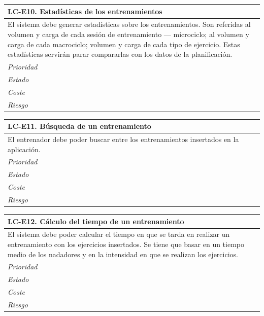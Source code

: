 	\begin{center}
		\begin{tabularx}{15cm}{|X|}
			\hline 
				\bf{LC-E10. Estadísticas de los entrenamientos}\\
			\hline
				El sistema debe generar estadísticas sobre los entrenamientos. Son referidas al volumen y carga de cada sesión de entrenamiento --- microciclo; al volumen y carga de cada macrociclo; volumen y carga de cada tipo de ejercicio. Estas estadísticas servirán parar compararlas con los datos de la planificación.\\
			\hline
				\it{Prioridad}\\
			\hline
				\it{Estado}\\
			\hline
				\it{Coste}\\
			\hline
				\it{Riesgo}\\
			\hline
		\end{tabularx}
	\end{center}
	
	\begin{center}
		\begin{tabularx}{15cm}{|X|}
			\hline 
				\bf{LC-E11. Búsqueda de un entrenamiento}\\
			\hline
				El entrenador debe poder buscar entre los entrenamientos insertados en la aplicación.\\
			\hline
				\it{Prioridad}\\
			\hline
				\it{Estado}\\
			\hline
				\it{Coste}\\
			\hline
				\it{Riesgo}\\
			\hline
		\end{tabularx}
	\end{center}
	
	\begin{center}
		\begin{tabularx}{15cm}{|X|}
			\hline 
				\bf{LC-E12. Cálculo del tiempo de un entrenamiento}\\
			\hline
				El sistema debe poder calcular el tiempo en que se tarda en realizar un entrenamiento con los ejercicios insertados. Se tiene que basar en un tiempo medio de los nadadores y en la intensidad en que se realizan los ejercicios.\\
			\hline
				\it{Prioridad}\\
			\hline
				\it{Estado}\\
			\hline
				\it{Coste}\\
			\hline
				\it{Riesgo}\\
			\hline
		\end{tabularx}
	\end{center}

